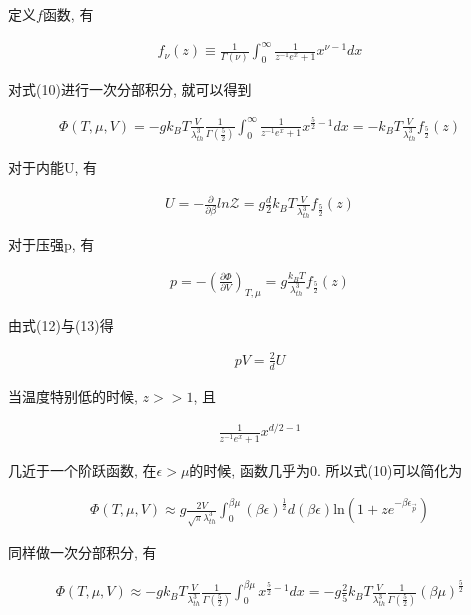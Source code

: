 \documentclass[a4paper, 12pt, notitlepage]{article}
\begin{document}
	定义$f$函数, 有
	
\begin{align*}
	f_\nu(z) \equiv \frac{1}{\Gamma(\nu)} \int_0^\infty \frac{1}{z^{-1}e^x + 1}x^{\nu - 1} dx
\end{align*}

	对式(10)进行一次分部积分, 就可以得到
	
\begin{align}
	\Phi(T, \mu, V)  = -gk_B T \frac{V}{\lambda_{th}^3} \frac{1}{\Gamma(\frac{5}{2})} \int_0^\infty \frac{1}{z^{-1}e^x + 1}x^{\frac{5}{2} - 1} dx= -k_BT\frac{V}{\lambda_{th}^3}f_{\frac{5}{2}}(z)
\end{align}

	对于内能U, 有
	
\begin{align}
	U = -\frac{\partial}{\partial \beta} ln\mathcal{Z} = g\frac{d}{2} k_B T\frac{V}{\lambda_{th}^3}f_{\frac{5}{2}}(z)
\end{align}

	对于压强p, 有
	
\begin{align}
	p = -(\frac{\partial\Phi}{\partial V})_{T, \mu} = g\frac{k_B T}{\lambda_{th}^3} f_{\frac{5}{2}}(z)
\end{align}

	由式(12)与(13)得
	
\begin{align}
	pV = \frac{2}{d}U
\end{align}

	当温度特别低的时候, $z>>1$, 且
	
\begin{align*}
	\frac{1}{z^{-1}e^x + 1}x^{d/2 - 1}
\end{align*} 

	几近于一个阶跃函数, 在$\epsilon > \mu$的时候, 函数几乎为0. 所以式(10)可以简化为
	
\begin{align*}
	\Phi(T, \mu, V) \approx g\frac{2V}{\sqrt{\pi}\lambda_{th}^3}\int^{\beta \mu}_0 (\beta \epsilon)^\frac{1}{2} d(\beta \epsilon) \textrm{ln}(1+ze^{-\beta \epsilon_{\vec{p}}})
\end{align*}

	同样做一次分部积分, 有
	
\begin{align}
	\Phi(T, \mu, V) \approx -gk_B T \frac{V}{\lambda_{th}^3} \frac{1}{\Gamma(\frac{5}{2})} \int_0^{\beta \mu} x^{\frac{5}{2} - 1} dx = -g\frac{2}{5}k_B T\frac{V}{\lambda_{th}^3} \frac{1}{\Gamma(\frac{5}{2})} (\beta \mu)^{\frac{5}{2}}
\end{align}
\end{document}
